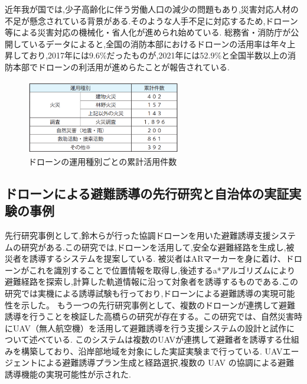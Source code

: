 近年我が国では,少子高齢化に伴う労働人口の減少の問題もあり,災害対応人材の不足が懸念されている背景がある.そのような人手不足に対応するため,ドローン等による災害対応の機械化・省人化が進められ始めている.
総務省・消防庁が公開しているデータ\cite{soumusho-01}によると,全国の消防本部におけるドローンの活用率は年々上昇しており,2017年には9.6\%だったものが,2021年には52.9\%と全国半数以上の消防本部でドローンの利活用が進めらたことが報告されている.
\begin{figure}[H] 
  \centering 
  \includegraphics[width=0.6\textwidth]{Figures/2024-11-28 215911.png}
  \caption{ドローンの運用種別ごとの累計活用件数} 
  \label{fig:01} 
\end{figure}



\subsection{ドローンによる避難誘導の先行研究と自治体の実証実験の事例}
先行研究事例として,鈴木らが行った協調ドローンを用いた避難誘導支援システムの研究がある\cite{suzuki2020drone}.この研究では,ドローンを活用して,安全な避難経路を生成し,被災者を誘導するシステムを提案している.
被災者はARマーカーを身に着け、ドローンがこれを識別することで位置情報を取得し,後述するa*アルゴリズムにより避難経路を探索し,計算した軌道情報に沿って対象者を誘導するものである.この研究では実機による誘導試験も行っており,ドローンによる避難誘導の実現可能性を示した。
もう一つの先行研究事例として、複数のドローンが連携して避難誘導を行うことを検証した高橋らの研究が存在する\cite{takahashi2018uav}。この研究では、自然災害時にUAV（無人航空機）を活用して避難誘導を行う支援システムの設計と試作について述べている.
このシステムは複数のUAVが連携して避難者を誘導する仕組みを構築しており、沿岸部地域を対象にした実証実験まで行っている. UAVエージェントによる避難誘導プラン生成と経路選択,複数の UAV の協調による避難誘導機能の実現可能性が示された.\par

